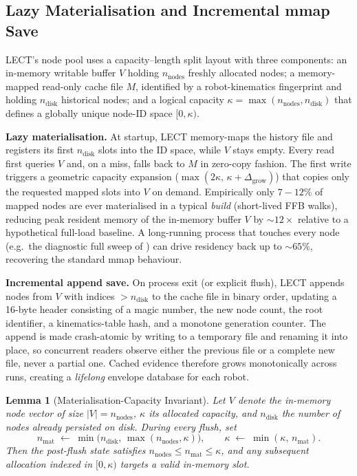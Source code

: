 \documentclass[journal]{IEEEtran}
\newtheorem{lemma}{Lemma}
\begin{document}
\subsection{Lazy Materialisation and Incremental mmap Save}\label{sec:lect_lazy}

LECT's node pool uses a capacity--length split layout with three
components: an in-memory writable buffer $V$ holding $n_\text{nodes}$
freshly allocated nodes; a memory-mapped read-only cache file $M$,
identified by a robot-kinematics fingerprint and holding $n_\text{disk}$
historical nodes; and a logical capacity
$\kappa = \max(n_\text{nodes}, n_\text{disk})$ that defines a globally
unique node-ID space $[0, \kappa)$.

\textbf{Lazy materialisation.}
At startup, LECT memory-maps the history file and registers its first
$n_\text{disk}$ slots into the ID space, while $V$ stays empty. Every
read first queries $V$ and, on a miss, falls back to $M$ in zero-copy
fashion. The first write triggers a geometric capacity expansion
($\max(2\kappa,\,\kappa+\Delta_\text{grow})$) that copies only the
requested mapped slots into $V$ on demand. Empirically only $7\!-\!12\%$
of mapped nodes are ever materialised in a typical \emph{build}
(short-lived FFB walks), reducing peak resident memory of the
in-memory buffer $V$ by ${\sim}12\times$ relative to a hypothetical
full-load baseline. A long-running process that touches every node
(e.g.\ the diagnostic full sweep of ) can drive
residency back up to ${\sim}65\%$, recovering the standard mmap
behaviour.

\textbf{Incremental append save.}
On process exit (or explicit flush), LECT appends nodes from $V$ with
indices $>n_\text{disk}$ to the cache file in binary order, updating a
16-byte header consisting of a magic number, the new node count, the
root identifier, a kinematics-table hash, and a monotone generation
counter. The append is made crash-atomic by writing to a temporary
file and renaming it into place, so concurrent readers observe either
the previous file or a complete new file, never a partial one. Cached
evidence therefore grows monotonically across runs, creating a
\emph{lifelong} envelope database for each robot.

\begin{lemma}[Materialisation-Capacity Invariant]\label{lem:lect_invariant}
Let $V$ denote the in-memory node vector of size $|V|=n_\text{nodes}$,
$\kappa$ its allocated capacity, and $n_\text{disk}$ the number of
nodes already persisted on disk. During every flush, set
\begin{equation}\label{eq:lect_invariant}
n_\text{mat}\;\leftarrow\;\min\!\bigl(n_\text{disk},\,
\max(n_\text{nodes},\kappa)\bigr),
\qquad
\kappa\;\leftarrow\;\min(\kappa,\,n_\text{mat}).
\end{equation}
Then the post-flush state satisfies
$n_\text{nodes}\le n_\text{mat}\le \kappa$, and any subsequent
allocation indexed in $[0,\kappa)$ targets a valid in-memory slot.
\end{lemma}
\end{document}

